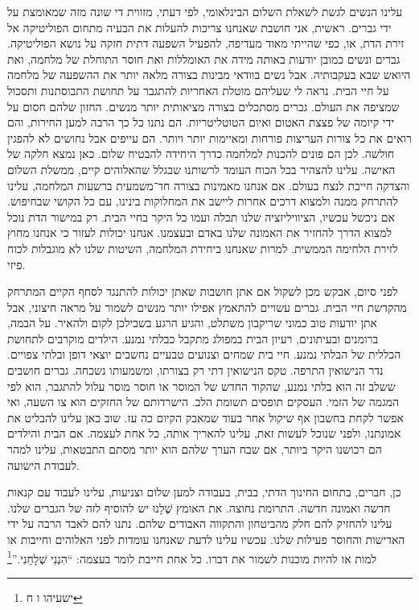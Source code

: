 \documentclass[14pt, article, extrafontsizes, twopage, a4paper]{memoir}
\begin{document}
עלינו הנשים לגשת לשאלת השלום הבינלאומי,
לפי דעתי, מזווית די שונה מזה
שמאומצת על ידי גברים. ראשית, אני חושבת שאנחנו צריכות להעלות
את הבעיה מתחום הפוליטיקה אל זירת
הדת, או, כפי שהייתי מאוד מעדיפה, להפעיל
השפעה דתית חזקה על נושא הפוליטיקה. גברים
ונשים כמובן יודעות באותה מידה את האומללות ואת
חוסר התוחלת של מלחמה, ואת היואש שבא בעקבותיה.
אבל נשים בוודאי מבינות בצורה מלאה יותר את ההשפעה
של מלחמה על חיי הבית. נראה לי שעליהם מוטלת האחריות
להתגבר על תחושת התבוסתנות ותסכול
שמציפה את העולם. גברים מסתכלים בצורה
מציאותית יותר מנשים. החזון שלהם
חסום על ידי קיומה של פצצת האטום ואיום
הטוטליטריות. הם נתנו כל כך הרבה למען
החירות, והם רואים את כל צורות העריצות פורחות
ומאיימות יותר ויותר. הם עייפים אבל
נחושים לא להפגין חולשה. לכן הם פונים להכנות למלחמה
כדרך היחידה להבטיח שלום. כאן נמצא
חלקה של האישה. עלינו להצהיר בכל הכוח
העומד לרשותנו שבגלל שהאלוהים קיים, ממשלת השלום
והצדקה חייבת לנצח בעולם. אם אנחנו מאמינות בצורה חד־משמעית
ברשעות המלחמה, עלינו להתרחק ממנה
ולמצוא דרכים אחרות ליישב את המחלוקות בינינו,
עם כל הקושי שבחיפוש. אם ניכשל עכשיו, הציוויליזציה שלנו
תכלה ועמו כל היקר בחיי הבית.
רק במישור הדת נוכל למצוא
הדרך להחזיר את האמונה שלנו באדם ובעצמנו. אנחנו
יכולות לעזור כי אנחנו מחוץ לזירת הלחימה הממשית.
למרות שאנחנו ביחידת המלחמה, השיטות שלנו לא
מוגבלות לכוח פיזי.

לפני סיום, אבקש מכן לשקול אם
אתן חושבות שאתן יכולות להתנגד לסחף הקיים המתרחק
מהקדשת חיי הבית. גברים עשויים להתאמץ אפילו יותר
מנשים לשמור על מראה חיצוני, אבל אתן יודעות טוב כמוני
שריקבון משתלט, והגיע הרגע
בשבילכן לקום ולהאיר. על הבמה,
ברומנים ובעיתונים, רעיון הבית במפולג
מתקבל כבלתי נמנע. הילדים מוקרבים
לתחושת הכללית של הבלתי נמנע.
חיי בית שמחים וצנועים טבעיים נחשבים
יוצאי דופן ובלתי צפויים. נדר הנישואין התרפה.
טקס הנישואין דתי רק בצורתו,
ומשמעותו נשכחה. גברים חושבים
ששלב זה הוא בלתי נמנע, שהקוד החדש של המוסר או
חוסר מוסר עלול להתגבר, הוא לפי המגמה של הזמי.
העסקים תופסים תשומת הלב. הישרדותם של החזקים
הוא צו השעה, ואי אפשר לקחת בחשבון אף שיקול אחר
בעוד שמאבק הקיום כה עז. שוב כאן
עלינו להבליט את אמונתנו, ולפני שנוכל לעשות זאת, עלינו להאריך אותה,
כל אחת לעצמה. אם הבית והילדים
הם רכושנו היקר ביותר, אם שבח
הערך שלהם הוא יותר מסתם התבטאות, עלינו
למהר לעבודת הישועה.

כן, חברים, בתחום החינוך הדתי, בבית,
בעבודה למען שלום וצניעות, עלינו לעבוד עם
קנאות חדשה ואמונה חדשה. התרומת נחוצה. את האומץ שֶׁלָנוּ
יש להוסיף לזה של הגברים שלנו. עלינו להחזיק
להם חלק מהביטחון והתקווה האבודים שלהם. נתנו
להם לאבד הרבה על ידי האדישות והחוסר פעילות שלנו. עכשיו עלינו
לדעת שאנחנו עומדות לפני האלוהים וחייבות או למות
או להיות מוכנות לשמור את דברו. כל אחת חייבת לומר
בעצמה: ``הִנְנִי שְׁלָחֵנִי.''\footnote{ישעיהו ו ח}
\end{document}
